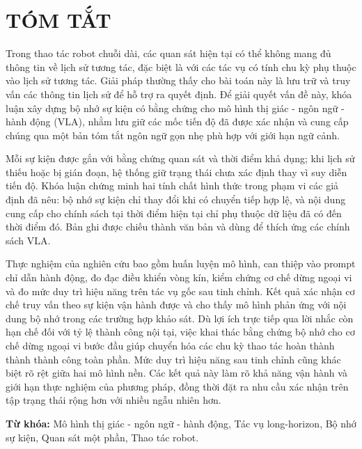 \chapter*{TÓM TẮT}
\thispagestyle{empty}

Trong thao tác robot chuỗi dài, các quan sát hiện tại có thể không mang đủ thông tin về lịch sử tương tác, đặc biệt là với các tác vụ có tính chu kỳ phụ thuộc vào lịch sử tương tác. Giải pháp thường thấy cho bài toán này là lưu trữ và truy vấn các thông tin lịch sử để hỗ trợ ra quyết định. Để giải quyết vấn đề này, khóa luận xây dựng bộ nhớ sự kiện có bằng chứng cho mô hình thị giác - ngôn ngữ - hành động (VLA), nhằm lưu giữ các mốc tiến độ đã được xác nhận và cung cấp chúng qua một bản tóm tắt ngôn ngữ gọn nhẹ phù hợp với giới hạn ngữ cảnh.

Mỗi sự kiện được gắn với bằng chứng quan sát và thời điểm khả dụng; khi lịch sử thiếu hoặc bị gián đoạn, hệ thống giữ trạng thái chưa xác định thay vì suy diễn tiến độ. Khóa luận chứng minh hai tính chất hình thức trong phạm vi các giả định đã nêu: bộ nhớ sự kiện chỉ thay đổi khi có chuyển tiếp hợp lệ, và nội dung cung cấp cho chính sách tại thời điểm hiện tại chỉ phụ thuộc dữ liệu đã có đến thời điểm đó. Bản ghi được chiếu thành văn bản và dùng để thích ứng các chính sách VLA.

Thực nghiệm của nghiên cứu bao gồm huấn luyện mô hình, can thiệp vào prompt chỉ dẫn hành động, đo đạc điều khiển vòng kín, kiểm chứng cơ chế dừng ngoại vi và đo mức duy trì hiệu năng trên tác vụ gốc sau tinh chỉnh. Kết quả xác nhận cơ chế truy vấn theo sự kiện vận hành được và cho thấy mô hình phản ứng với nội dung bộ nhớ trong các trường hợp khảo sát. Dù lợi ích trực tiếp qua lời nhắc còn hạn chế đối với tỷ lệ thành công nội tại, việc khai thác bằng chứng bộ nhớ cho cơ chế dừng ngoại vi bước đầu giúp chuyển hóa các chu kỳ thao tác hoàn thành thành thành công toàn phần. Mức duy trì hiệu năng sau tinh chỉnh cũng khác biệt rõ rệt giữa hai mô hình nền. Các kết quả này làm rõ khả năng vận hành và giới hạn thực nghiệm của phương pháp, đồng thời đặt ra nhu cầu xác nhận trên tập trạng thái rộng hơn với nhiều ngẫu nhiên hơn.

\textbf{Từ khóa:} Mô hình thị giác - ngôn ngữ - hành động, Tác vụ long-horizon, Bộ nhớ sự kiện, Quan sát một phần, Thao tác robot.

